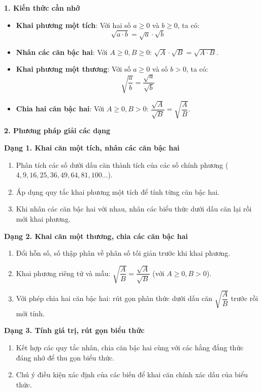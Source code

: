\textbf{1. Kiến thức cần nhớ}
\begin{itemize}
\item \textbf{Khai phương một tích}: Với hai số $a \ge 0$ và $b \ge 0$, ta có:
$$\boxed{\sqrt{a \cdot b} = \sqrt{a} \cdot \sqrt{b}}$$
\item \textbf{Nhân các căn bậc hai}: Với $A \ge 0, B \ge 0$: $\sqrt{A} \cdot \sqrt{B} = \sqrt{A \cdot B}$.
\item \textbf{Khai phương một thương}: Với số $a \ge 0$ và số $b > 0$, ta có:
$$\boxed{\sqrt{\dfrac{a}{b}} = \dfrac{\sqrt{a}}{\sqrt{b}}}$$
\item \textbf{Chia hai căn bậc hai}: Với $A \ge 0, B > 0$: $\dfrac{\sqrt{A}}{\sqrt{B}} = \sqrt{\dfrac{A}{B}}$.
\end{itemize}

\textbf{2. Phương pháp giải các dạng}

\textbf{Dạng 1. Khai căn một tích, nhân các căn bậc hai}
\begin{enumerate}
\item Phân tích các số dưới dấu căn thành tích của các số chính phương ($4, 9, 16, 25, 36, 49, 64, 81, 100\dots$).
\item Áp dụng quy tắc khai phương một tích để tính từng căn bậc hai.
\item Khi nhân các căn bậc hai với nhau, nhân các biểu thức dưới dấu căn lại rồi mới khai phương.
\end{enumerate}

\textbf{Dạng 2. Khai căn một thương, chia các căn bậc hai}
\begin{enumerate}
\item Đổi hỗn số, số thập phân về phân số tối giản trước khi khai phương.
\item Khai phương riêng tử và mẫu: $\sqrt{\dfrac{A}{B}} = \dfrac{\sqrt{A}}{\sqrt{B}}$ (với $A \ge 0, B > 0$).
\item Với phép chia hai căn bậc hai: rút gọn phân thức dưới dấu căn $\sqrt{\dfrac{A}{B}}$ trước rồi mới tính.
\end{enumerate}

\textbf{Dạng 3. Tính giá trị, rút gọn biểu thức}
\begin{enumerate}
\item Kết hợp các quy tắc nhân, chia căn bậc hai cùng với các hằng đẳng thức đáng nhớ để thu gọn biểu thức.
\item Chú ý điều kiện xác định của các biến để khai căn chính xác dấu của biểu thức.
\end{enumerate}
